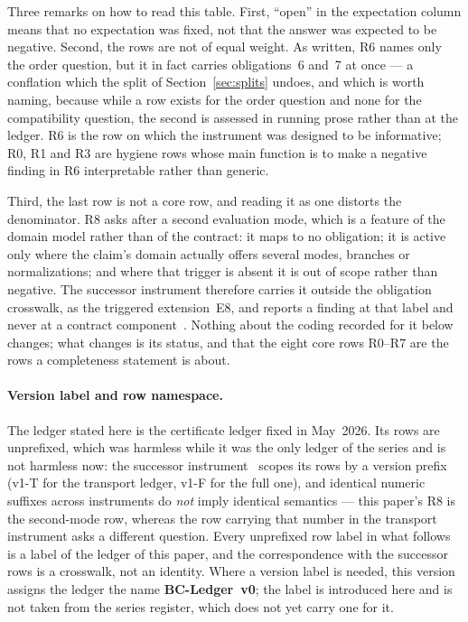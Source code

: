 \documentclass[11pt,a4paper]{article}
\theoremstyle{definition}
\begin{document}
Three remarks on how to read this table. First, ``open'' in the expectation
column means that no expectation was fixed, not that the answer was expected to
be negative. Second, the rows are not of equal weight. As written, R6 names only
the order question, but it in fact carries obligations~6 and~7 at once --- a
conflation which the split of Section~\ref{sec:splits} undoes, and which is worth
naming, because while a row exists for the order question and none for the
compatibility question, the second is assessed in running prose rather than at
the ledger. R6 is the row on which the instrument was designed to be informative;
R0, R1 and R3 are hygiene rows whose main function is to make a negative finding
in R6 interpretable rather than generic.

Third, the last row is not a core row, and reading it as one distorts the
denominator. R8 asks after a second evaluation mode, which is a feature of the
domain model rather than of the contract: it maps to no obligation; it is active
only where the claim's domain actually offers several modes, branches or
normalizations; and where that trigger is absent it is out of scope rather than
negative. The successor instrument therefore carries it outside the obligation
crosswalk, as the triggered extension~E8, and reports a finding at that label and
never at a contract component~\cite{GeigerBCM2026}. Nothing about the coding
recorded for it below changes; what changes is its status, and that the eight
core rows R0--R7 are the rows a completeness statement is about.

\paragraph{Version label and row namespace.} The ledger stated here is the
certificate ledger fixed in May~2026. Its rows are unprefixed, which was harmless
while it was the only ledger of the series and is not harmless now: the successor
instrument~\cite{GeigerBCM2026} scopes its rows by a version prefix (v1-T for the
transport ledger, v1-F for the full one), and identical numeric suffixes across
instruments do \emph{not} imply identical semantics --- this paper's R8 is the
second-mode row, whereas the row carrying that number in the transport instrument
asks a different question. Every unprefixed row label in what follows is a label
of the ledger of this paper, and the correspondence with the successor rows is a
crosswalk, not an identity. Where a version label is needed, this version assigns
the ledger the name \textbf{BC-Ledger~v0}; the label is introduced here and is
not taken from the series register, which does not yet carry one for it.
\end{document}
